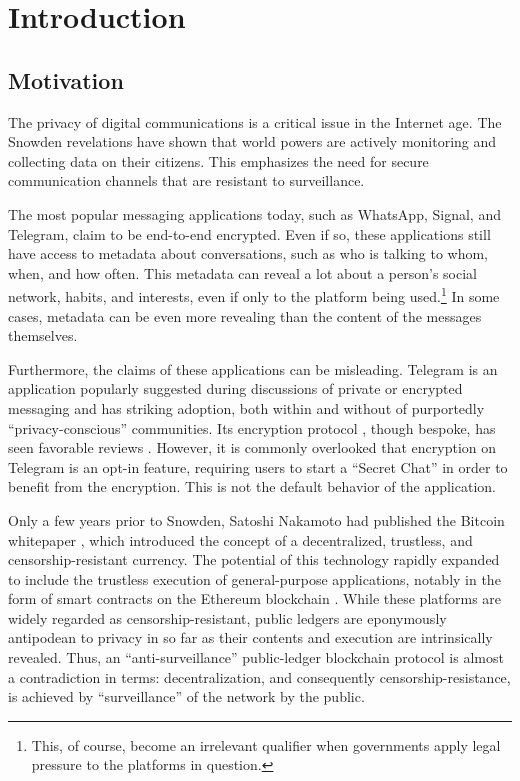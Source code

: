 \chapter{Introduction}

\label{Introduction}

\section{Motivation}\label{motivation}

The privacy of digital communications is a critical issue in the Internet age. The Snowden revelations \parencite{greenwald_nsa_2013} have shown that world powers are actively monitoring and collecting data on their citizens. This emphasizes the need for secure communication channels that are resistant to surveillance.

The most popular messaging applications today, such as WhatsApp, Signal, and Telegram, claim to be end-to-end encrypted. Even if so, these applications still have access to metadata about conversations, such as who is talking to whom, when, and how often. This metadata can reveal a lot about a person's social network, habits, and interests, even if only to the platform being used.\footnote{This, of course, become an irrelevant qualifier when governments apply legal pressure to the platforms in question.} In some cases, metadata can be even more revealing than the content of the messages themselves.

Furthermore, the claims of these applications can be misleading. Telegram is an application popularly suggested during discussions of private or encrypted messaging \parencite{collins_best_2022, key_best_2024} and has striking adoption, both within and without of purportedly ``privacy-conscious'' communities. Its encryption protocol \parencite{telegram_mtproto_2021}, though bespoke, has seen favorable reviews \parencite{miculan_automated_2023}. However, it is commonly overlooked that encryption on Telegram is an opt-in feature, requiring users to start a ``Secret Chat'' in order to benefit from the encryption. This is not the default behavior of the application.

Only a few years prior to Snowden, Satoshi Nakamoto had published the Bitcoin whitepaper \parencite{nakamoto_bitcoin_2008}, which introduced the concept of a decentralized, trustless, and censorship-resistant currency. The potential of this technology rapidly expanded to include the trustless execution of general-purpose applications, notably in the form of smart contracts on the Ethereum blockchain \parencite{buterin_ethereum_2014}. While these platforms are widely regarded as censorship-resistant, public ledgers are eponymously antipodean to privacy in so far as their contents and execution are intrinsically revealed. Thus, an ``anti-surveillance'' public-ledger blockchain protocol is almost a contradiction in terms: decentralization, and consequently censorship-resistance, is achieved by ``surveillance'' of the network by the public.

